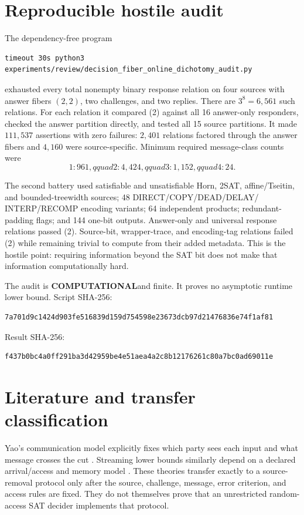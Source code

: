 \documentclass[11pt]{article}
\newcommand{\COMP}{\textbf{COMPUTATIONAL}}
\begin{document}
\section{Reproducible hostile audit}

The dependency-free program
\begin{verbatim}
timeout 30s python3 experiments/review/decision_fiber_online_dichotomy_audit.py
\end{verbatim}
exhausted every total nonempty binary response relation on four sources with
answer fibers $(2,2)$, two challenges, and two replies.  There are
$3^8=6{,}561$ such relations.  For each relation it compared (2) against all
16 answer-only responders, checked the answer partition directly, and tested
all 15 source partitions.  It made $111{,}537$ assertions with zero failures:
$2{,}401$ relations factored through the answer fibers and $4{,}160$ were
source-specific.  Minimum required message-class counts were
\[
 1:961,qquad 2:4{,}424,qquad 3:1{,}152,qquad 4:24.
\]

The second battery used satisfiable and unsatisfiable Horn, 2SAT,
affine/Tseitin, and bounded-treewidth sources; 48 DIRECT/COPY/DEAD/DELAY/
INTERP/RECOMP encoding variants; 64 independent products; redundant-padding
flags; and 144 one-bit outputs.  Answer-only and universal response relations
passed (2).  Source-bit, wrapper-trace, and encoding-tag relations failed (2)
while remaining trivial to compute from their added metadata.  This is the
hostile point: requiring information beyond the SAT bit does not make that
information computationally hard.

The audit is \COMP and finite.  It proves no asymptotic runtime lower bound.
Script SHA-256:
\begin{verbatim}
7a701d9c1424d903fe516839d159d754598e23673dcb97d21476836e74f1af81
\end{verbatim}
Result SHA-256:
\begin{verbatim}
f437b0bc4a0ff291ba3d42959be4e51aea4a2c8b12176261c80a7bc0ad69011e
\end{verbatim}

\section{Literature and transfer classification}

Yao's communication model explicitly fixes which party sees each input and
what message crosses the cut \cite{Yao79}.  Streaming lower bounds similarly
depend on a declared arrival/access and memory model \cite{BKM18}.  These
theories transfer exactly to a source-removal protocol only after the source,
challenge, message, error criterion, and access rules are fixed.  They do not
themselves prove that an unrestricted random-access SAT decider implements
that protocol.
\end{document}
